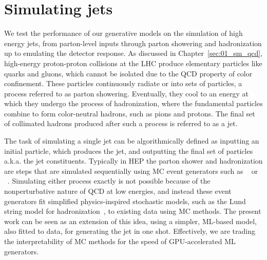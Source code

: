 
\section{Simulating jets}
\label{sec:04_jetnet_jets}

We test the performance of our generative models on the simulation of high energy jets, from parton-level inputs through parton showering and hadronization up to emulating the detector response.
As discussed in Chapter~\ref{sec:01_sm_qcd}, high-energy proton-proton collisions at the LHC produce elementary particles like quarks and gluons, which cannot be isolated due to the QCD property of color confinement.
These particles continuously radiate or into sets of particles, a process referred to as parton showering. 
Eventually, they cool to an energy at which they undergo the process of hadronization, where the fundamental particles combine to form color-neutral hadrons, such as pions and protons. 
The final set of collimated hadrons produced after such a process is referred to as a jet. 

The task of simulating a single jet can be algorithmically defined as inputting an initial particle, which produces the jet, and outputting the final set of particles a.k.a. the jet constituents. 
Typically in HEP the parton shower and hadronization are steps that are simulated sequentially using MC event generators such as \PYTHIA~\cite{pythia} or \HERWIG~\cite{herwig}. 
Simulating either process exactly is not possible because of the nonperturbative nature of QCD at low energies, and instead these event generators fit simplified physics-inspired stochastic models, such as the Lund string model for hadronization~\cite{Andersson:1983ia}, to existing data using MC methods.
The present work can be seen as an extension of this idea, using a simpler, ML-based model, also fitted to data, for generating the jet in one shot.
Effectively, we are trading the interpretability of MC methods for the speed of GPU-accelerated ML generators. 


